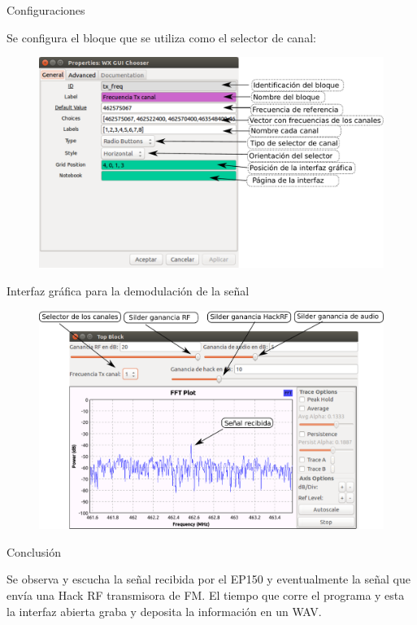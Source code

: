 \begin{frame}{Configuraciones}

Se configura el bloque que se utiliza como el selector de canal:

\begin{figure}[H]
\centering
\vspace{-3mm}
\includegraphics[width=\textwidth]{parte3/lab10/pdf/lab10_12.pdf}
\end{figure}

\end{frame}

\begin{frame}{Interfaz gráfica para la demodulación de la señal}

\begin{figure}[H]
\centering
\vspace{-3mm}
\includegraphics[width=\textwidth]{parte3/lab10/pdf/lab10_13.pdf}
\end{figure}

\end{frame}

\begin{frame}{Conclusión}

Se observa y escucha la señal recibida por el EP150 y eventualmente la señal que envía una Hack RF transmisora de FM. El tiempo que corre el programa y esta la interfaz abierta graba y deposita la información en un WAV.

\end{frame}


